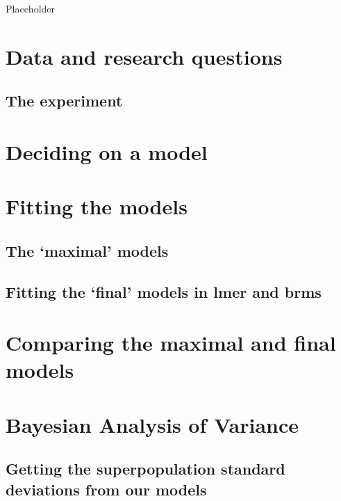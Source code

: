\documentclass[
]{book}
\begin{document}
Placeholder

\hypertarget{data-and-research-questions-7}{%
\section{Data and research questions}\label{data-and-research-questions-7}}

\hypertarget{the-experiment}{%
\subsection{The experiment}\label{the-experiment}}

\hypertarget{deciding-on-a-model}{%
\section{Deciding on a model}\label{deciding-on-a-model}}

\hypertarget{fitting-the-models}{%
\section{Fitting the models}\label{fitting-the-models}}

\hypertarget{the-maximal-models}{%
\subsection{The `maximal' models}\label{the-maximal-models}}

\hypertarget{fitting-the-final-models-in-lmer-and-brms}{%
\subsection{Fitting the `final' models in lmer and brms}\label{fitting-the-final-models-in-lmer-and-brms}}

\hypertarget{comparing-the-maximal-and-final-models}{%
\section{Comparing the maximal and final models}\label{comparing-the-maximal-and-final-models}}

\hypertarget{bayesian-analysis-of-variance}{%
\section{Bayesian Analysis of Variance}\label{bayesian-analysis-of-variance}}

\hypertarget{getting-the-superpopulation-standard-deviations-from-our-models}{%
\subsection{Getting the superpopulation standard deviations from our models}\label{getting-the-superpopulation-standard-deviations-from-our-models}}
\end{document}
